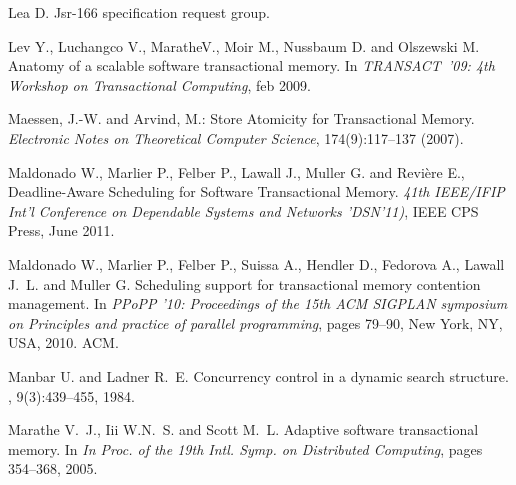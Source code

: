 \begin{thebibliography}{99}
{%

Lea D.
\newblock Jsr-166 specification request group.


Lev Y., Luchangco V., MaratheV., Moir M., Nussbaum D. and
  Olszewski M.
\newblock Anatomy of a scalable software transactional memory.
\newblock In {\em TRANSACT~'09: 4th Workshop on Transactional Computing}, feb
  2009.



 Maessen, J.-W. and Arvind, M.:
 Store Atomicity for Transactional Memory. 
{\it Electronic  Notes  on Theoretical  Computer Science}, 
174(9):117--137 (2007).



Maldonado W.,  Marlier P., Felber P.,  Lawall J., Muller G. and Revi\`ere E., 
Deadline-Aware Scheduling for Software Transactional Memory. 
{\it 41th  IEEE/IFIP Int'l  Conference on  Dependable  Systems and Networks
'DSN'11)}, IEEE CPS Press, June 2011. 


Maldonado W., Marlier P., Felber P., Suissa A., Hendler D.,
  Fedorova A., Lawall J.~L. and Muller G.
\newblock Scheduling support for transactional memory contention management.
\newblock In {\em PPoPP '10: Proceedings of the 15th ACM SIGPLAN symposium on
  Principles and practice of parallel programming}, pages 79--90, New York, NY,
  USA, 2010. ACM.



Manbar U. and Ladner R.~E.
\newblock Concurrency control in a dynamic search structure.
, 9(3):439--455, 1984.






Marathe V.~J., Iii W.N.~S. and  Scott M.~L.
\newblock Adaptive software transactional memory.
\newblock In {\em In Proc. of the 19th Intl. Symp. on Distributed Computing},
  pages 354--368, 2005.

}
\end{thebibliography}
